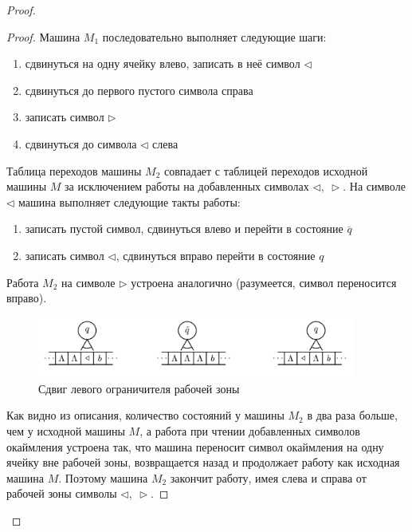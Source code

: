 \documentclass[a4paper, 12pt]{article}
\begin{document}
\begin{proof}
\begin{proof}
        Машина $M_1$ последовательно выполняет следующие шаги:
        
        \begin{enumerate}
            \item сдвинуться на одну ячейку влево, записать в неё символ $\triangleleft$
            \item сдвинуться до первого пустого символа справа
            \item записать символ $\triangleright$
            \item сдвинуться до символа $\triangleleft$ слева
        \end{enumerate}
        
        Таблица переходов машины $M_2$ совпадает с таблицей переходов исходной машины $M$ за исключением работы на добавленных символах $\triangleleft,\ \triangleright$. На символе $\triangleleft$ машина выполняет следующие такты работы:
        
        \begin{enumerate}
            \item записать пустой символ, сдвинуться влево и перейти в состояние $\overline{q}$ 
            \item  записать символ $\triangleleft$, сдвинуться вправо перейти в состояние $q$
        \end{enumerate}
        
         Работа $M_2$ на символе $\triangleright$ устроена аналогично (разумеется, символ переносится вправо).
        
        \begin{figure}[h]
            \begin{center}
            \begin{minipage}[h]{0.6\linewidth}
                \includegraphics[height=2cm, width=\linewidth]{images/MTboarder.png}
                \caption{Сдвиг левого ограничителя рабочей зоны}
            \end{minipage}
            \end{center}
        \end{figure}
        
        Как видно из описания, количество состояний у машины $M_2$ в два раза больше, чем у исходной машины $M$, а работа при чтении добавленных символов окаймления устроена так, что машина переносит символ окаймления на одну ячейку вне рабочей зоны, возвращается назад и продолжает работу как исходная машина $M$. Поэтому машина $M_2$ закончит работу, имея слева и справа от рабочей зоны символы $\triangleleft,\ \triangleright$.
        

\end{proof}
\end{proof}
\end{document}
